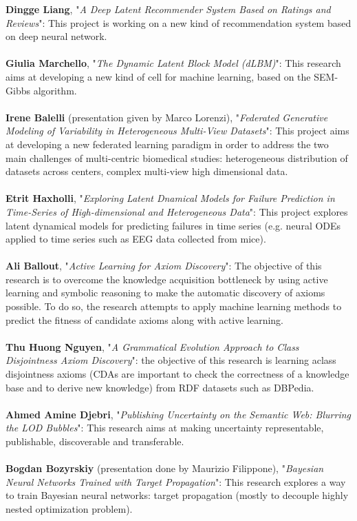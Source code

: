\documentclass[a4paper]{article}
\begin{document}
\textbf{Dingge Liang}, "\textit{A Deep Latent Recommender System Based on Ratings and Reviews}": This project is working on a new kind of recommendation system based on deep neural network.
\\\\
\textbf{Giulia Marchello}, "\textit{The Dynamic Latent Block Model (dLBM)}": This research aims at developing a new kind of cell for machine learning, based on the SEM-Gibbs algorithm.
\\\\
\textbf{Irene Balelli} (presentation given by Marco Lorenzi), "\textit{Federated Generative Modeling of Variability in Heterogeneous Multi-View Datasets}": This project aims at developing a new federated learning paradigm in order to address the two main challenges of multi-centric biomedical studies: heterogeneous distribution of datasets across centers, complex multi-view high dimensional data.
\\\\
\textbf{Etrit Haxholli}, "\textit{Exploring Latent Dnamical Models for Failure Prediction in Time-Series of High-dimensional and Heterogeneous Data}": This project explores latent dynamical models for predicting failures in time series (e.g. neural ODEs applied to time series such as EEG data collected from mice).
\\\\
\textbf{Ali Ballout}, "\textit{Active Learning for Axiom Discovery}": The objective of this research is to overcome the knowledge acquisition bottleneck by using active learning and symbolic reasoning to make the automatic discovery of axioms possible. To do so, the research attempts to apply machine learning methods to predict the fitness of candidate axioms along with active learning.
\\\\
\textbf{Thu Huong Nguyen}, "\textit{A Grammatical Evolution Approach to Class Disjointness Axiom Discovery}": the objective of this research is learning aclass disjointness axioms (CDAs are important to check the correctness of a knowledge base and to derive new knowledge) from RDF datasets such as DBPedia. 
\\\\
\textbf{Ahmed Amine Djebri}, "\textit{Publishing Uncertainty on the Semantic Web: Blurring the LOD Bubbles}": This research aims at making uncertainty representable, publishable, discoverable and transferable.
\\\\
\textbf{Bogdan Bozyrskiy} (presentation done by Maurizio Filippone), "\textit{Bayesian Neural Networks Trained with Target Propagation}": This research explores a way to train Bayesian neural networks: target propagation (mostly to decouple highly nested optimization problem). 
\end{document}
